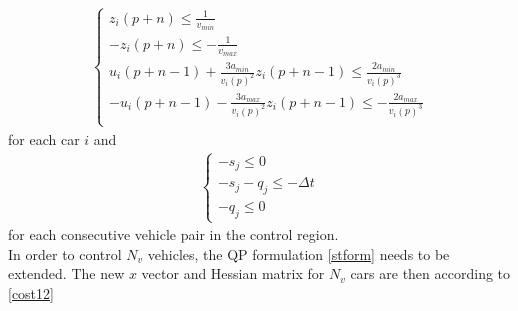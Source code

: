 \documentclass[letterpaper,10pt,conference]{ieeeconf}
\begin{document}
\begin{align}\label{ineq}
        \begin{cases}
            z_i(p+n) \leq \frac{1}{v_{min}} \\
            -z_i(p+n) \leq -\frac{1}{v_{max}}  \\
            u_i(p+n-1) + \frac{3a_{min}}{v_{i}(p)^2}z_i(p+n-1) \leq \frac{2a_{min}}{v_{i}(p)^3} \\
            -u_i(p+n-1) - \frac{3a_{max}}{v_{i}(p)^2}z_i(p+n-1) \leq -\frac{2a_{max}}{v_{i}(p)^3} \\
        \end{cases}
\end{align}
for each car $i$ and
\begin{align}\label{ineq2}
        \begin{cases}
            - s_j \leq 0\\
            - s_j - q_j \leq - \Delta t\\
            -q_j \leq 0
        \end{cases}    
\end{align}
for each consecutive vehicle pair in the control region.\\ \indent
In order to control $N_v$ vehicles, the QP formulation \eqref{stform} needs to be extended. The new $x$ vector and Hessian matrix for $N_v$ cars are then according to \eqref{cost12}

\end{document}
